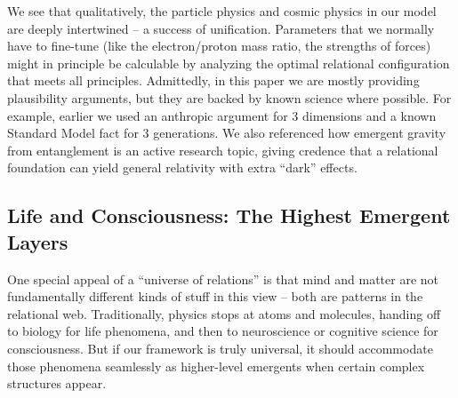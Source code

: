 \documentclass{article}
\begin{document}
We see that qualitatively, the particle physics and cosmic physics in our model are deeply intertwined – a success of unification. Parameters that we normally have to fine-tune (like the electron/proton mass ratio, the strengths of forces) might in principle be calculable by analyzing the optimal relational configuration that meets all principles. Admittedly, in this paper we are mostly providing plausibility arguments, but they are backed by known science where possible. For example, earlier we used an anthropic argument for 3 dimensions\cite{tegmark1997} and a known Standard Model fact for 3 generations\cite{kobayashi1973}. We also referenced how emergent gravity from entanglement is an active research topic\cite{vanraamsdonk2010}, giving credence that a relational foundation can yield general relativity with extra “dark” effects\cite{verlinde2011}.

\subsection{Life and Consciousness: The Highest Emergent Layers}

One special appeal of a “universe of relations” is that mind and matter are not fundamentally different kinds of stuff in this view – both are patterns in the relational web. Traditionally, physics stops at atoms and molecules, handing off to biology for life phenomena, and then to neuroscience or cognitive science for consciousness. But if our framework is truly universal, it should accommodate those phenomena seamlessly as higher-level emergents when certain complex structures appear.
\end{document}
